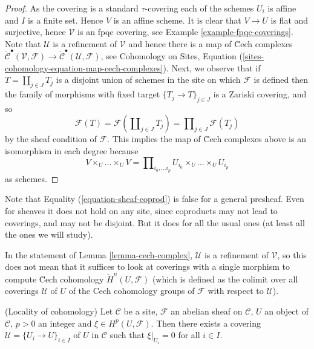 \begin{proof}
As the covering is a standard $\tau$-covering each of the schemes
$U_i$ is affine and $I$ is a finite set. Hence $V$ is an affine scheme.
It is clear that $V \to U$ is flat and surjective, hence
$\mathcal{V}$ is an fpqc covering, see
Example \ref{example-fpqc-coverings}.
Note that $\mathcal{U}$ is a refinement of $\mathcal{V}$
and hence there is a map of \u Cech complexes
$\check{\mathcal{C}}^\bullet (\mathcal{V}, \mathcal{F}) \to
\check{\mathcal{C}}^\bullet (\mathcal{U}, \mathcal{F})$, see
Cohomology on Sites,
Equation (\ref{sites-cohomology-equation-map-cech-complexes}).
Next, we observe that if $T = \coprod_{j \in J} T_j$ is a
disjoint union of schemes in the site on which $\mathcal{F}$ is defined
then the family of morphisms with fixed target
$\{T_j \to T\}_{j \in J}$ is a Zariski covering, and so
\begin{equation}
\label{equation-sheaf-coprod}
\mathcal{F}(T) =
\mathcal{F}(\coprod\nolimits_{j \in J} T_j) =
\prod\nolimits_{j \in J} \mathcal{F}(T_j)
\end{equation}
by the sheaf condition of $\mathcal{F}$.
This implies the map of \u Cech complexes above is an isomorphism
in each degree because
$$
V \times_U \ldots \times_U V
=
\prod\nolimits_{i_0, \ldots i_p} U_{i_0} \times_U \ldots \times_U U_{i_p}
$$
as schemes.
\end{proof}

\noindent
Note that Equality (\ref{equation-sheaf-coprod})
is false for a general presheaf. Even for sheaves it does not hold on any
site, since coproducts may not lead to coverings, and may not be disjoint.
But it does for all the usual ones (at least all the ones we will study).

\begin{remark}
\label{remark-refinement}
In the statement of
Lemma \ref{lemma-cech-complex},
$\mathcal{U}$ is a refinement of $\mathcal{V}$,
so this does not mean that it suffices to look at coverings with a single
morphism to compute \u Cech cohomology $\check H^n(U, \mathcal{F})$ (which
is defined as the colimit over all coverings $\mathcal{U}$ of $U$ of the
Cech cohomology groups of $\mathcal{F}$ with respect to $\mathcal{U}$).
\end{remark}

\begin{lemma}
\label{lemma-locality-cohomology}
(Locality of cohomology)
Let $\mathcal{C}$ be a site, $\mathcal{F}$ an abelian sheaf on $\mathcal{C}$,
$U$ an object of $\mathcal{C}$, $p >0$ an integer and $\xi \in
H^p(U, \mathcal{F})$. Then there exists a covering
$\mathcal{U} = \{U_i \to U\}_{i \in I}$ of $U$ in $\mathcal{C}$
such that $\xi |_{U_i} = 0$ for all $i \in I$.
\end{lemma}

